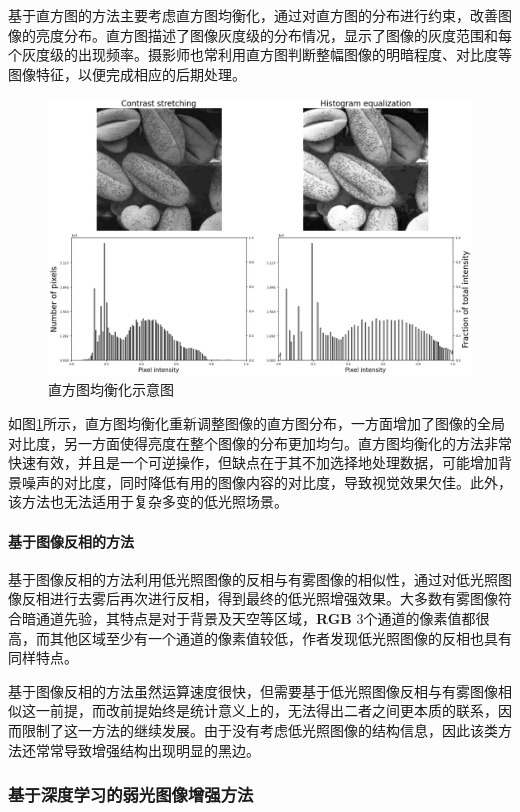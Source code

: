 \documentclass[a4paper]{ctexart}
\begin{document}
	基于直方图的方法主要考虑直方图均衡化\cite{stark2000adaptive}，通过对直方图的分布进行约束，改善图像的亮度分布。直方图描述了图像灰度级的分布情况，显示了图像的灰度范围和每个灰度级的出现频率。摄影师也常利用直方图判断整幅图像的明暗程度、对比度等图像特征，以便完成相应的后期处理。
	
	\begin{figure}[htb]
		\centering 
		\includegraphics[width=0.7\columnwidth]{picture/LLIE/HE/Histogram equalization}
		\caption{
			\label{fig: Histogram equalization} 
			直方图均衡化示意图
		}
	\end{figure}
	
	如图\ref{fig: Histogram equalization}所示，直方图均衡化重新调整图像的直方图分布，一方面增加了图像的全局对比度，另一方面使得亮度在整个图像的分布更加均匀。直方图均衡化的方法非常快速有效，并且是一个可逆操作，但缺点在于其不加选择地处理数据，可能增加背景噪声的对比度，同时降低有用的图像内容的对比度，导致视觉效果欠佳。此外，该方法也无法适用于复杂多变的低光照场景。
	
	\paragraph{基于图像反相的方法}
	
	基于图像反相的方法\cite{dong2010fast}利用低光照图像的反相与有雾图像的相似性，通过对低光照图像反相进行去雾后再次进行反相，得到最终的低光照增强效果。大多数有雾图像符合暗通道先验，其特点是对于背景及天空等区域，\textbf{RGB} 3个通道的像素值都很高，而其他区域至少有一个通道的像素值较低，作者发现低光照图像的反相也具有同样特点。
	
	基于图像反相的方法虽然运算速度很快，但需要基于低光照图像反相与有雾图像相似这一前提，而改前提始终是统计意义上的，无法得出二者之间更本质的联系，因而限制了这一方法的继续发展。由于没有考虑低光照图像的结构信息，因此该类方法还常常导致增强结构出现明显的黑边。
	
	\subsubsection{基于深度学习的弱光图像增强方法}
	
\end{document}
